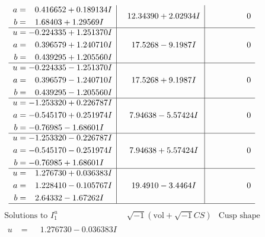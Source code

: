 \documentclass[1p]{elsarticle_modified}
\theoremstyle{definition}
\newcommand{\I}{\sqrt{-1}}
\begin{document}
$$\begin{array}{c|c|c}
\begin{aligned}
a &= \phantom{-}0.416652 + 0.189134 I \\
b &= \phantom{-}1.68403 + 1.29569 I\end{aligned}
 & \phantom{-}12.34390 + 2.02934 I & \phantom{-0.000000 } 0 \\ \hline\begin{aligned}
u &= -0.224335 + 1.251370 I \\
a &= \phantom{-}0.396579 + 1.240710 I \\
b &= \phantom{-}0.439295 + 1.205560 I\end{aligned}
 & \phantom{-}17.5268 - 9.1987 I & \phantom{-0.000000 } 0 \\ \hline\begin{aligned}
u &= -0.224335 - 1.251370 I \\
a &= \phantom{-}0.396579 - 1.240710 I \\
b &= \phantom{-}0.439295 - 1.205560 I\end{aligned}
 & \phantom{-}17.5268 + 9.1987 I & \phantom{-0.000000 } 0 \\ \hline\begin{aligned}
u &= -1.253320 + 0.226787 I \\
a &= -0.545170 + 0.251974 I \\
b &= -0.76985 - 1.68601 I\end{aligned}
 & \phantom{-}7.94638 - 5.57424 I & \phantom{-0.000000 } 0 \\ \hline\begin{aligned}
u &= -1.253320 - 0.226787 I \\
a &= -0.545170 - 0.251974 I \\
b &= -0.76985 + 1.68601 I\end{aligned}
 & \phantom{-}7.94638 + 5.57424 I & \phantom{-0.000000 } 0 \\ \hline\begin{aligned}
u &= \phantom{-}1.276730 + 0.036383 I \\
a &= \phantom{-}1.228410 - 0.105767 I \\
b &= \phantom{-}2.64332 - 1.67262 I\end{aligned}
 & \phantom{-}19.4910 - 3.4464 I & \phantom{-0.000000 } 0\\
 \hline 
 \end{array}$$\newpage$$\begin{array}{c|c|c}  
\text{Solutions to }I^u_{1}& \I (\text{vol} + \sqrt{-1}CS) & \text{Cusp shape}\\
 \hline 
\begin{aligned}
u &= \phantom{-}1.276730 - 0.036383 I \\

\end{aligned}
\end{array}$$
\end{document}

